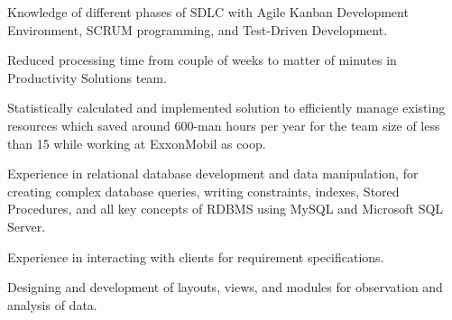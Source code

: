 

\begin{cventries}
\vspace{-5mm}
  \cventry
    {}
    {}
    {}
    {}
    {
      \begin{cvitems}
        \item {Knowledge of different phases of SDLC with Agile Kanban Development Environment, SCRUM programming, and Test-Driven Development.}
         \item {Reduced processing time from couple of weeks to matter of minutes in Productivity Solutions team.}
        \item {Statistically calculated and implemented solution to efficiently manage existing resources which saved around 600-man hours per year for the team size of less than 15 while working at ExxonMobil as coop.}
        \item {Experience in relational database development and data manipulation, for creating complex database queries, writing constraints, indexes, Stored Procedures, and all key concepts of RDBMS using MySQL and Microsoft SQL Server.}
        \item {Experience in interacting with clients for requirement specifications.}
        \item {Designing and development of layouts, views, and modules for observation and analysis of data.}
      \end{cvitems}
    }
\end{cventries}
